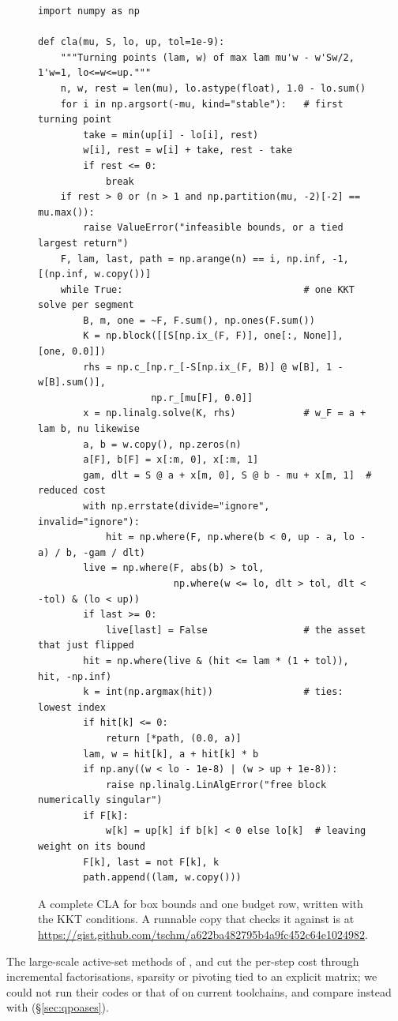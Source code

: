 \begin{figure}[!ht]
\begin{lstlisting}[style=pyin,basicstyle=\ttfamily\footnotesize]
import numpy as np

def cla(mu, S, lo, up, tol=1e-9):
    """Turning points (lam, w) of max lam mu'w - w'Sw/2, 1'w=1, lo<=w<=up."""
    n, w, rest = len(mu), lo.astype(float), 1.0 - lo.sum()
    for i in np.argsort(-mu, kind="stable"):   # first turning point
        take = min(up[i] - lo[i], rest)
        w[i], rest = w[i] + take, rest - take
        if rest <= 0:
            break
    if rest > 0 or (n > 1 and np.partition(mu, -2)[-2] == mu.max()):
        raise ValueError("infeasible bounds, or a tied largest return")
    F, lam, last, path = np.arange(n) == i, np.inf, -1, [(np.inf, w.copy())]
    while True:                                # one KKT solve per segment
        B, m, one = ~F, F.sum(), np.ones(F.sum())
        K = np.block([[S[np.ix_(F, F)], one[:, None]], [one, 0.0]])
        rhs = np.c_[np.r_[-S[np.ix_(F, B)] @ w[B], 1 - w[B].sum()],
                    np.r_[mu[F], 0.0]]
        x = np.linalg.solve(K, rhs)            # w_F = a + lam b, nu likewise
        a, b = w.copy(), np.zeros(n)
        a[F], b[F] = x[:m, 0], x[:m, 1]
        gam, dlt = S @ a + x[m, 0], S @ b - mu + x[m, 1]  # reduced cost
        with np.errstate(divide="ignore", invalid="ignore"):
            hit = np.where(F, np.where(b < 0, up - a, lo - a) / b, -gam / dlt)
        live = np.where(F, abs(b) > tol,
                        np.where(w <= lo, dlt > tol, dlt < -tol) & (lo < up))
        if last >= 0:
            live[last] = False                 # the asset that just flipped
        hit = np.where(live & (hit <= lam * (1 + tol)), hit, -np.inf)
        k = int(np.argmax(hit))                # ties: lowest index
        if hit[k] <= 0:
            return [*path, (0.0, a)]
        lam, w = hit[k], a + hit[k] * b
        if np.any((w < lo - 1e-8) | (w > up + 1e-8)):
            raise np.linalg.LinAlgError("free block numerically singular")
        if F[k]:
            w[k] = up[k] if b[k] < 0 else lo[k]  # leaving weight on its bound
        F[k], last = not F[k], k
        path.append((lam, w.copy()))
\end{lstlisting}
\caption{A complete CLA for box bounds and one budget row, written with the KKT conditions.
A runnable copy that checks it against  is at
\url{https://gist.github.com/tschm/a622ba482795b4a9fc452c64e1024982}.}
\label{fig:kktcla}
\end{figure}

The large-scale active-set methods of \citet{perold1984}, \citet{stein2008} and
\citet{hirschberger2010} cut the per-step cost through incremental factorisations,
sparsity or pivoting tied to an explicit matrix; we could not run their codes or that of
\citet{niedermayer2010} on current toolchains, and compare instead with 
(\S\ref{sec:qpoases}).
